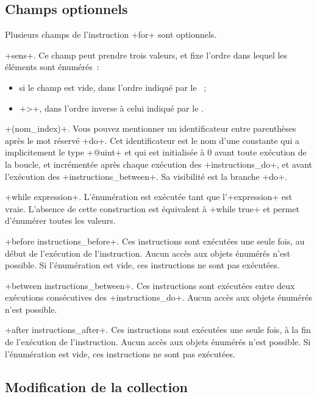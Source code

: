 \subsection{Champs optionnels}

Plusieurs champs de l'instruction \ggs+for+ sont optionnels.


\ggs+sens+. Ce champ peut prendre trois valeurs, et fixe l'ordre dans lequel les éléments sont énumérés~:
\begin{itemize}
  \item si le champ est vide, dans l'ordre indiqué par le ~;
  \item \ggs+>+, dans l'ordre inverse à celui indiqué par le .
\end{itemize}


\ggs+(nom_index)+. Vous pouvez mentionner un identificateur entre parenthèses après le mot réservé \ggs+do+. Cet identificateur est le nom d'une constante qui a implicitement le type \ggs+@uint+ et qui est initialisée à 0 avant toute exécution de la boucle, et incrémentée après chaque exécution des \ggs+instructions_do+, et avant l'exécution des \ggs+instructions_between+. Sa visibilité est la branche \ggs+do+.

\ggs+while expression+. L'énumération est exécutée tant que l'\ggs+expression+ est vraie. L'absence de cette construction est équivalent à \ggs+while true+ et permet d'énumérer toutes les valeurs.


\ggs+before instructions_before+. Ces instructions sont exécutées une seule fois, au début de l'exécution de l'instruction. Aucun accès aux objets énumérés n'est possible. Si l'énumération est vide, ces instructions ne sont pas exécutées.

\ggs+between instructions_between+. Ces instructions sont exécutées entre deux exécutions consécutives des \ggs+instructions_do+. Aucun accès aux objets énumérés n'est possible.

\ggs+after instructions_after+. Ces instructions sont exécutées une seule fois, à la fin de l'exécution de l'instruction. Aucun accès aux objets énumérés n'est possible. Si l'énumération est vide, ces instructions ne sont pas exécutées.


\subsection{Modification de la collection}

